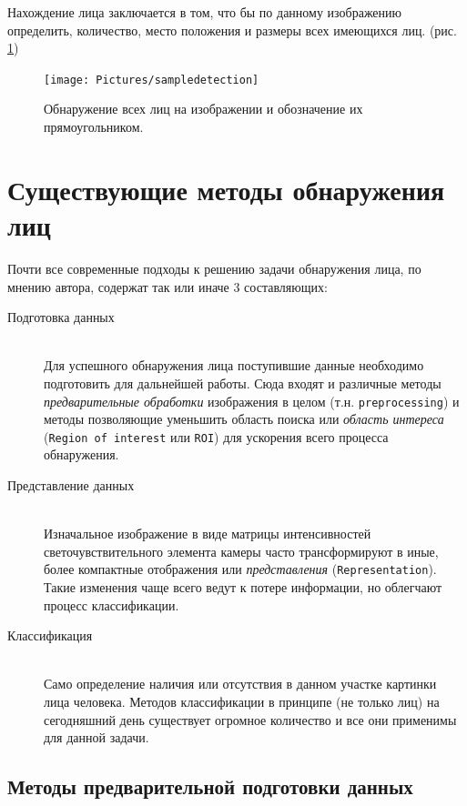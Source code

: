 \documentclass[12pt]{report}
\begin{document}
Нахождение лица заключается в том, что бы по данному изображению определить, количество, место положения и размеры всех имеющихся лиц. (рис. \ref{fig:sampledetection}) \citep{liu2010automatically}

\begin{figure}[h]
	\centering
	\texttt{[image: Pictures/sampledetection]}
	\caption{Обнаружение всех лиц на изображении и обозначение их прямоугольником.}
	\label{fig:sampledetection}
\end{figure}

\section{Существующие методы обнаружения лиц}

Почти все современные подходы к решению задачи обнаружения лица, по мнению автора, содержат так или иначе 3 составляющих:

\begin{description}

\item[Подготовка данных]\hfill \\
	Для успешного обнаружения лица поступившие данные необходимо подготовить для дальнейшей работы. Сюда входят и различные методы \emph{предварительные обработки} изображения в целом (т.н. \texttt{preprocessing}) и методы позволяющие уменьшить область поиска или \emph{область интереса} (\texttt{Region of interest} или \texttt{ROI}) для ускорения всего процесса обнаружения.
\item[Представление данных]\hfill \\ 
	Изначальное изображение в виде матрицы интенсивностей светочувствительного элемента камеры часто трансформируют в иные, более компактные отображения или \emph{представления} (\texttt{Representation}). Такие изменения чаще всего ведут к потере информации, но облегчают процесс классификации.
\item[Классификация]\hfill \\ 
	Само определение наличия или отсутствия в данном участке картинки лица человека. Методов классификации в принципе (не только лиц) на сегодняшний день существует огромное количество и все они применимы для данной задачи.
\end{description}

\subsection{Методы предварительной подготовки данных}
\end{document}
